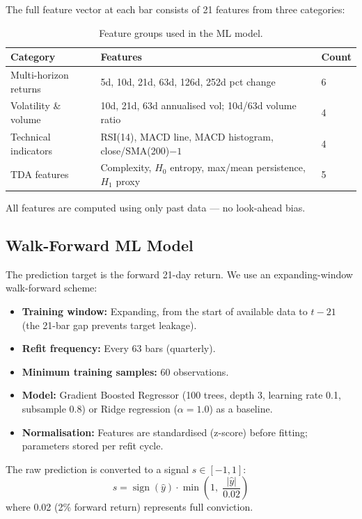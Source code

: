 \documentclass[11pt, a4paper]{article}
\begin{document}
The full feature vector at each bar consists of 21 features from three categories:

\begin{table}[H]
\centering
\caption{Feature groups used in the ML model.}
\label{tab:features}
\begin{tabular}{lll}
\toprule
\textbf{Category} & \textbf{Features} & \textbf{Count} \\
\midrule
Multi-horizon returns & 5d, 10d, 21d, 63d, 126d, 252d pct change & 6 \\
Volatility \& volume & 10d, 21d, 63d annualised vol; 10d/63d volume ratio & 4 \\
Technical indicators & RSI(14), MACD line, MACD histogram, close/SMA(200)$-1$ & 4 \\
TDA features & Complexity, $H_0$ entropy, max/mean persistence, $H_1$ proxy & 5 \\
\bottomrule
\end{tabular}
\end{table}

All features are computed using only past data --- no look-ahead bias.

\subsection{Walk-Forward ML Model}

The prediction target is the forward 21-day return. We use an expanding-window walk-forward scheme:

\begin{itemize}[nosep]
    \item \textbf{Training window:} Expanding, from the start of available data to $t - 21$ (the 21-bar gap prevents target leakage).
    \item \textbf{Refit frequency:} Every 63 bars (quarterly).
    \item \textbf{Minimum training samples:} 60 observations.
    \item \textbf{Model:} Gradient Boosted Regressor (100 trees, depth 3, learning rate 0.1, subsample 0.8) or Ridge regression ($\alpha = 1.0$) as a baseline.
    \item \textbf{Normalisation:} Features are standardised (z-score) before fitting; parameters stored per refit cycle.
\end{itemize}

The raw prediction is converted to a signal $s \in [-1, 1]$:
\[
    s = \operatorname{sign}(\hat{y}) \cdot \min\!\left(1,\; \frac{|\hat{y}|}{0.02}\right)
\]
where 0.02 (2\% forward return) represents full conviction.
\end{document}
